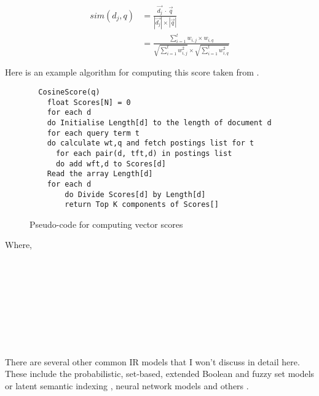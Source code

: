 \begin{equation}
  \begin{split}
  sim(d_j,q) &= \frac{\vec{d_j} \ \cdot \ \vec{q}}{|\vec{d_j}| \times |\vec{q}|}\\
  &= \frac{\sum_{i=1}^{t}w_{i,j} \times w_{i,q}}
  {\sqrt{\sum_{i=1}^{t}w_{i,j}^{2}} \times \sqrt{\sum_{i=1}^{t}w_{i,q}^{2}}}
  \end{split}
  \label{eq:sim2}
\end{equation}

Here is an example algorithm for computing this score taken from \citep[p.125]{Manning2009}.

\begin{figure}[htb]
  \begin{lstlisting}
  CosineScore(q)
    float Scores[N] = 0
    for each d
    do Initialise Length[d] to the length of document d
    for each query term t
    do calculate wt,q and fetch postings list for t
      for each pair(d, tft,d) in postings list
      do add wft,d to Scores[d]
    Read the array Length[d]
    for each d
    	do Divide Scores[d] by Length[d]
    	return Top K components of Scores[]
  \end{lstlisting}
\caption[Pseudo-code for computing vector scores]{Pseudo-code for computing vector scores}
\label{fig:VectorScores}
\end{figure}

Where,\\
 \\
 \\
 \\
 \\
 \\
 \\
 \\
 \\
 

There are several other common IR models that I won't discuss in detail here. These include the probabilistic, set-based, extended Boolean and fuzzy set \citep{Miyamoto2010, Miyamoto1988, Srinivasan2001, Widyantoro2001, Miyamoto1986} models or latent semantic indexing \citep{Deerwester1990}, neural network models and others \citep{Macdonald2009, Schuetze1998, Schuetze}.


